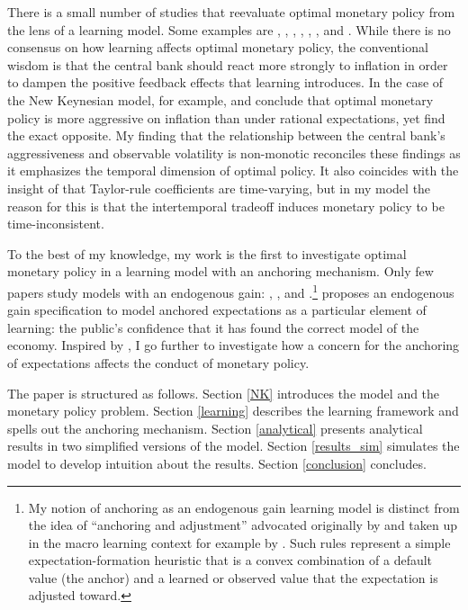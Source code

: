 \documentclass[11pt]{article}
\renewcommand{\[}{\begin{equation}}
\renewcommand{\]}{\end{equation}}
\begin{document}
There is a small number of studies that reevaluate optimal monetary policy from the lens of a learning model. Some examples are \cite{orphanides2005decline}, \cite{gaspar2006adaptive}, \cite{evans2006monetary}, \cite{ferrero2007monetary}, \cite{PRESTON2008}, \cite{molnar2014optimal}, \cite{eusepi2018science} and \cite{eusepi2018limits}. While there is no consensus on how learning affects optimal monetary policy, the conventional wisdom is that the central bank should react more strongly to inflation in order to dampen the positive feedback effects that learning introduces. In the case of the New Keynesian model, for example, \cite{eusepi2018science} and \cite{molnar2014optimal} conclude that optimal monetary policy is more aggressive on inflation than under rational expectations, yet \cite{eusepi2018limits} find the exact opposite. My finding that the relationship between the central bank's aggressiveness and observable volatility is non-monotic reconciles these findings as it emphasizes the temporal dimension of optimal policy. It also coincides with the insight of \cite{LUBIK201685} that Taylor-rule coefficients are time-varying, but in my model the reason for this is that the intertemporal tradeoff induces monetary policy to be time-inconsistent.

To the best of my knowledge, my work is the first to investigate optimal monetary policy in a learning model with an anchoring mechanism. Only few papers study models with an endogenous gain: \cite{marcet2003recurrent}, \cite{milani2014learning}, and \cite{carvalho2019anchored}.\footnote{My notion of anchoring as an endogenous gain learning model is distinct from the idea of ``anchoring and adjustment'' advocated originally by \cite{tversky1974judgment} and taken up in the macro learning context for example by \cite{anufriev2012evolutionary}. Such rules represent a simple expectation-formation heuristic that is a convex combination of a default value (the anchor) and a learned or observed value that the expectation is adjusted toward.} \cite{carvalho2019anchored} proposes an endogenous gain specification to model anchored expectations as a particular element of learning: the public's confidence that it has found the correct model of the economy. Inspired by \cite{carvalho2019anchored}, I go further to investigate how a concern for the anchoring of expectations affects the conduct of monetary policy.

The paper is structured as follows. Section \ref{NK} introduces the model and the monetary policy problem. Section \ref{learning} describes the learning framework and spells out the anchoring mechanism. Section \ref{analytical} presents analytical results in two simplified versions of the model. Section \ref{results_sim} simulates the model to develop intuition about the results. Section \ref{conclusion} concludes.
\end{document}
